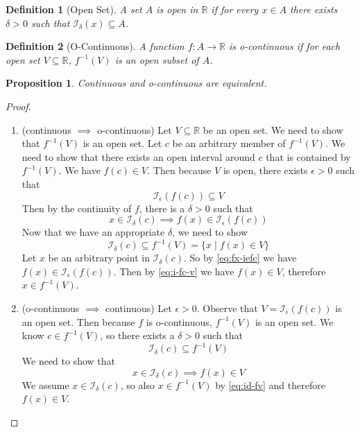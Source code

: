 \documentclass{article}
\newtheorem{proposition}[theorem]{Proposition}
\newtheorem{definition}{Definition}%
\newcommand{\Reals}[0]{\mathbb{R}}
\begin{document}
\begin{definition}[Open Set]
  A set $A$ is open in $\Reals$ if for every $x \in A$ there exists
  $\delta > 0$ such that $\mathcal{I}_\delta(x) \subseteq A$.
\end{definition}

\begin{definition}[O-Continuous]
  A function $f : A \to \Reals$ is o-continuous if for each
  open set $V \subseteq \Reals$, $f^{-1}(V)$ is an open subset of $A$.
\end{definition}

\begin{proposition}
  Continuous and o-continuous are equivalent.
\end{proposition}
\begin{proof}\ 
\begin{enumerate}
\item (continuous $\implies$ o-continuous)
  Let $V \subseteq \Reals$ be an open set.
  We need to show that $f^{-1}(V)$ is an open set.
  Let $c$ be an arbitrary member of $f^{-1}(V)$. We need 
  to show that there exists an open interval around $c$
  that is contained by $f^{-1}(V)$.
%
  We have $f(c) \in V$. Then because $V$ is open, there exists
  $\epsilon > 0$ such that
  \begin{equation}\label{eq:i-fc-v}
  \mathcal{I}_\epsilon(f(c)) \subseteq V
  \end{equation}
  Then by the
  continuity of $f$, there is a $\delta > 0$ such that 
  \begin{equation}\label{eq:fx-iefc}
    x \in \mathcal{I}_\delta(c) \implies  f(x) \in \mathcal{I}_\epsilon(f(c))
  \end{equation}
  Now that we have an appropriate $\delta$, we need to show
  \[
  \mathcal{I}_\delta(c) \subseteq f^{-1}(V) = \{ x \mid f(x) \in V \}
  \]
  Let $x$ be an arbitrary point in $\mathcal{I}_\delta(c)$.  So by
  \eqref{eq:fx-iefc} we have $f(x) \in \mathcal{I}_\epsilon(f(c))$.  Then by
  \eqref{eq:i-fc-v} we have $f(x) \in V$, therefore $x \in f^{-1}(V)$.


\item (o-continuous $\implies$ continuous) Let $\epsilon > 0$. Observe
  that $V=\mathcal{I}_\epsilon(f(c))$ is an open set.  Then because $f$ is
  o-continuous, $f^{-1}(V)$ is an open set.  We know $c \in
  f^{-1}(V)$, so there exists a $\delta > 0$ such that
  \begin{equation}\label{eq:id-fv}
    \mathcal{I}_\delta(c) \subseteq f^{-1}(V)
  \end{equation}
  We need to show that
  \[
  x \in \mathcal{I}_\delta(c)  \implies f(x) \in V
  \]
  We assume $x \in \mathcal{I}_\delta(c)$, so also $x \in f^{-1}(V)$
  by \eqref{eq:id-fv} and therefore $f(x) \in V$.

\end{enumerate}
\end{proof}
\end{document}
